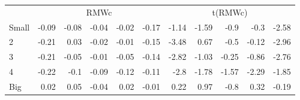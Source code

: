 \begin{table}[!ht]
\begin{tabular}{lrrrrrrrrrr}
  

      & \multicolumn{5}{c}{RMWc} & \multicolumn{5}{c}{t(RMWc)} \\
    \cmidrule(r){2-6} \cmidrule(r){7-11}
      Small  & -0.09  & -0.08  & -0.04  & -0.02  & -0.17   & -1.14  & -1.59  & -0.9  & -0.3  & -2.58  \\
          2  & -0.21  & 0.03  & -0.02  & -0.01  & -0.15   & -3.48  & 0.67  & -0.5  & -0.12  & -2.96  \\
          3  & -0.21  & -0.05  & -0.01  & -0.05  & -0.14   & -2.82  & -1.03  & -0.25  & -0.86  & -2.76  \\
          4  & -0.22  & -0.1  & -0.09  & -0.12  & -0.11   & -2.8  & -1.78  & -1.57  & -2.29  & -1.85  \\
      Big    & 0.02  & 0.05  & -0.04  & 0.02  & -0.01   & 0.22  & 0.97  & -0.8  & 0.32  & -0.19  \\

  

  \bottomrule
\end{tabular}
\label{tbl:25_Size_Mom_BS2015}
\end{table}